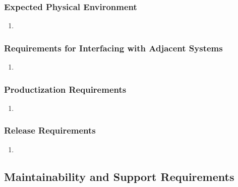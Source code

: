 \documentclass[]{article}
\begin{document}
\subsubsection{Expected Physical Environment}
\label{ssub:expected_physical_environment}
\begin{enumerate}[{OE-EPE}1. ]
	\item 
\end{enumerate}

\subsubsection{Requirements for Interfacing with Adjacent Systems}
\label{ssub:requirements_for_interfacing_with_adjacent_systems}
\begin{enumerate}[{OE-IA}1. ]
	\item 
\end{enumerate}

\subsubsection{Productization Requirements}
\label{ssub:productization_requirements}
\begin{enumerate}[{OE-P}1. ]
	\item 
\end{enumerate}

\subsubsection{Release Requirements}
\label{ssub:release_requirements}
\begin{enumerate}[{OE-R}1. ]
	\item 
\end{enumerate}


\subsection{Maintainability and Support Requirements}
\label{sub:maintainability_and_support_requirements}
\end{document}
